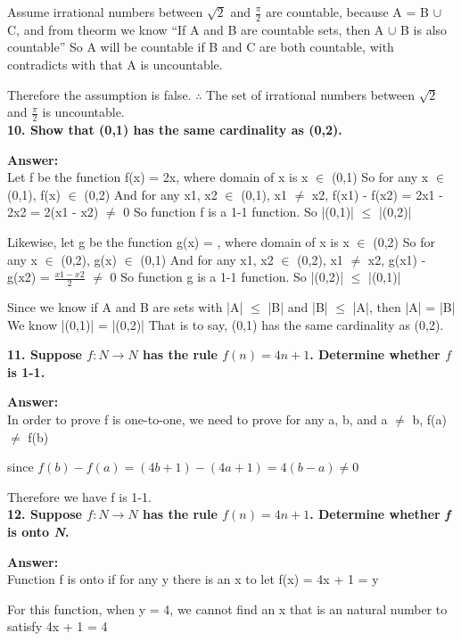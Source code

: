 \documentclass{article}
\begin{document}
\begin{large}
Assume irrational numbers between $\sqrt{2}$ and $\frac{\pi}{2}$ are countable, 
because A = B $\cup$ C, and from theorm we know ``If A and B are countable sets, then A $\cup$ B is also countable''
So A will be countable if B and C are both countable, with contradicts with that A is uncountable.

Therefore the assumption is false. 
$\therefore$ The set of irrational numbers between $\sqrt{2}$ and $\frac{\pi}{2}$ is uncountable.\\


\textbf{10. Show that (0,1) has the same cardinality as (0,2).}

\textbf{Answer:} \\

Let f be the function f(x) = 2x, where domain of x is x $\in$ (0,1)
So for any x $\in$ (0,1), f(x) $\in$ (0,2)
And for any x1, x2 $\in$ (0,1), x1 $\neq$ x2, f(x1) - f(x2) = 2x1 - 2x2 = 2(x1 - x2) $\neq$ 0
So function f is a 1-1 function.
So |(0,1)| $\le$ |(0,2)|

Likewise, let g be the function g(x) = , where domain of x is x $\in$ (0,2)
So for any x $\in$ (0,2), g(x) $\in$ (0,1)
And for any x1, x2 $\in$ (0,2), x1 $\neq$ x2, g(x1) - g(x2) = $\frac{x1 - x2}{2}$ $\neq$ 0
So function g is a 1-1 function.
So |(0,2)| $\le$ |(0,1)|

Since we know if A and B are sets with |A| $\le$ |B| and |B| $\le$ |A|, then |A| = |B|
We know |(0,1)| = |(0,2)|
That is to say, (0,1) has the same cardinality as (0,2).


\textbf{11. Suppose $f:N\to N$ has the rule $f(n)=4n+1$. Determine whether $f$ is 1-1.}

\textbf{Answer:} \\

In order to prove f is one-to-one, we need to prove for any a, b, and a $\neq$ b, f(a) $\neq$ f(b)

since $f(b) - f(a) = (4b + 1) - (4a + 1) = 4(b-a) \neq 0$

Therefore we have f is 1-1.\\


\textbf{12. Suppose $f:N\to N$ has the rule $f(n)=4n+1$. Determine whether \emph{f} is onto \emph{N}.}

\textbf{Answer:} \\

Function f is onto if for any y there is an x to let f(x) = 4x + 1 = y

For this function, when y = 4, we cannot find an x that is an natural number to satisfy 4x + 1 = 4


\end{large}
\end{document}
